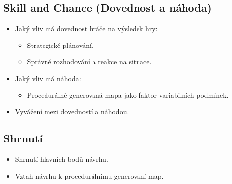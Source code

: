 \subsection{Skill and Chance (Dovednost a náhoda)}
\begin{itemize}
    \item Jaký vliv má dovednost hráče na výsledek hry:
    \begin{itemize}
        \item Strategické plánování.
        \item Správné rozhodování a reakce na situace.
    \end{itemize}
    \item Jaký vliv má náhoda:
    \begin{itemize}
        \item Procedurálně generovaná mapa jako faktor variabilních podmínek.
    \end{itemize}
    \item Vyvážení mezi dovedností a náhodou.
\end{itemize}

\subsection{Shrnutí}
\begin{itemize}
    \item Shrnutí hlavních bodů návrhu.
    \item Vztah návrhu k procedurálnímu generování map.
\end{itemize}
